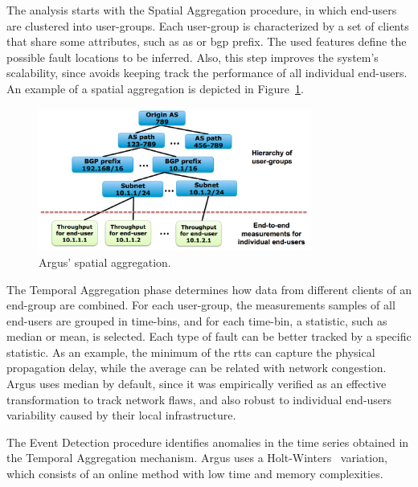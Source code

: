 The analysis starts with the Spatial Aggregation procedure, in which
end-users are clustered into user-groups.
Each user-group is characterized by a set of clients that share some
attributes, such as \gls*{as} or \gls*{bgp} prefix.
The used features define the possible fault locations to be inferred.
Also, this step improves the system's
scalability, since avoids keeping track the performance of all individual
end-users.
An example of a spatial aggregation is depicted in
Figure~\ref{fig:argus_spatial_aggregation}.

\begin{figure}[H]
    \centering
    \includegraphics[width=0.8\textwidth]{./figures/literature_review/argus_spatial_aggregation.png}
    \caption{Argus' spatial aggregation.~\cite{argus_end_to_end_service_anomaly_detection_and_localization_from_an_isps_point_of_view}}
\label{fig:argus_spatial_aggregation}
\end{figure}%

The Temporal Aggregation phase determines how data
from different clients of an end-group are combined.
For each user-group, the
measurements samples of all end-users are grouped in time-bins, and for each
time-bin, a statistic, such as median or mean, is selected.
Each type of fault can be better tracked by a specific statistic.
As an example, the
minimum of the \glspl*{rtt} can capture the physical propagation delay,
while the average can be related with network congestion. Argus uses median
by default, since it was empirically verified as an
effective transformation to track network flaws, and also robust to individual
end-users variability caused by their local infrastructure.

The Event Detection procedure identifies anomalies in the
time series obtained in the Temporal Aggregation mechanism.
Argus uses a Holt-Winters~\cite{holt-winters_forecasting_some_practical_issues}
variation, which consists of
an online method with low time and memory complexities.

